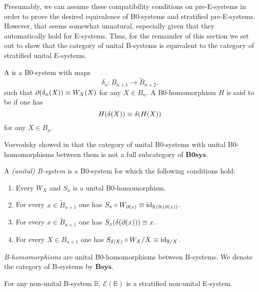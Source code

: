 Presumably, we can assume these compatibility conditions on pre-E-systems in order
to prove the desired equivalence of B0-systems and stratified pre-E-systems. However,
that seems somewhat unnatural, especially given that they automatically hold
for E-systems. Thus, for the remainder of this section we set out to show that
the category of unital B-systems is equivalent to the category of stratified 
unital E-systems.

\begin{defn}
A  is a B0-system with maps
\begin{equation*}
\delta_n : B_{n+1}\to \tilde{B}_{n+2}.
\end{equation*}
such that $\partial_{}(\delta_n(X))\equiv W_{X}(X)$ for any $X\in B_n$. 
A B0-homomorphism $H$ is said to be  if one has
\begin{equation*}
H(\delta(X))\equiv\delta(H(X))
\end{equation*}
for any $X\in B_n$.  
\end{defn}

\begin{rmk}
Voevodsky showed in \cite{VV_B-systems} that the category of unital B0-systems
with unital B0-homomorphisms between them is not a full
subcategory of $\mathbf{B0sys}$. 
\end{rmk}

\begin{defn}
A \emph{(unital) B-system} is a B0-system for which the following conditions
hold:
\begin{enumerate}
\item Every $W_X$ and $S_x$ is a unital B0-homomorphism.
\item For every $x\in \tilde{B}_{n+1}$ one has $S_x\circ W_{\partial_{}(x)}\equiv
{\mathrm{id}_{\mathbb{B}/\mathrm{ft}_{}(\partial_{}(x))}}$. 
\item For every $x\in\tilde{B}_{n+1}$ one has $S_x(\delta(\partial_{}(x)))\equiv x$.
\item For every $X\in B_{n+1}$ one has $S_{\delta(X)}\circ W_X/X\equiv
{\mathrm{id}_{\mathbb{B}/X}}$. 
\end{enumerate}
\emph{B-homomorphisms} are unital B0-homomorphisms between B-systems.
We denote the category of B-systems by $\mathbf{Bsys}$. 
\end{defn}

\begin{lem}
For any non-unital B-system $\mathbb{B}$, $\mathcal{E}(\mathbb{B})$ is a 
stratified non-unital E-system. 
\end{lem}

